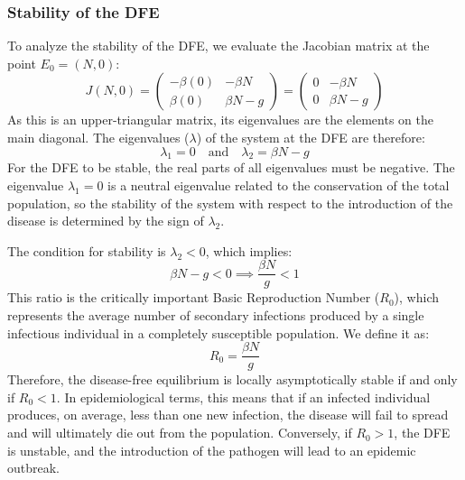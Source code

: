 \documentclass[12pt, a4paper]{article}
\begin{document}
\subsubsection{Stability of the DFE}
To analyze the stability of the DFE, we evaluate the Jacobian matrix at the point $E_0 = (N,0)$:
\[
J(N,0) =
\begin{pmatrix}
    -\beta(0) & -\beta N \\
    \beta(0)  & \beta N - g
\end{pmatrix}
=
\begin{pmatrix}
    0 & -\beta N \\
    0 & \beta N - g
\end{pmatrix}
\]
As this is an upper-triangular matrix, its eigenvalues are the elements on the main diagonal. The eigenvalues ($\lambda$) of the system at the DFE are therefore:
\[ \lambda_1 = 0 \quad \text{and} \quad \lambda_2 = \beta N - g \]
For the DFE to be stable, the real parts of all eigenvalues must be negative. The eigenvalue $\lambda_1 = 0$ is a neutral eigenvalue related to the conservation of the total population, so the stability of the system with respect to the introduction of the disease is determined by the sign of $\lambda_2$.

The condition for stability is $\lambda_2 < 0$, which implies:
\[ \beta N - g < 0 \implies \frac{\beta N}{g} < 1 \]
This ratio is the critically important Basic Reproduction Number ($R_0$), which represents the average number of secondary infections produced by a single infectious individual in a completely susceptible population. We define it as:
\[ R_0 = \frac{\beta N}{g} \]
Therefore, the disease-free equilibrium is locally asymptotically stable if and only if $R_0 < 1$. In epidemiological terms, this means that if an infected individual produces, on average, less than one new infection, the disease will fail to spread and will ultimately die out from the population. Conversely, if $R_0 > 1$, the DFE is unstable, and the introduction of the pathogen will lead to an epidemic outbreak.
\end{document}
